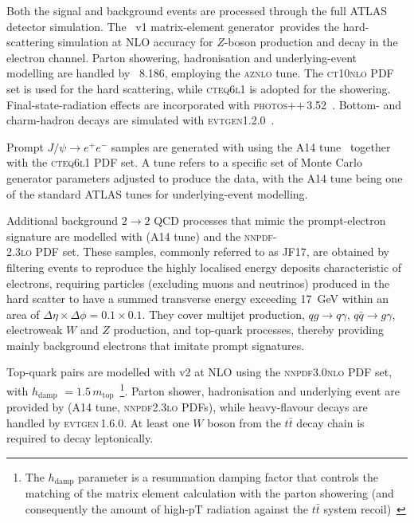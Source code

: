 Both the signal and background events are processed through the full ATLAS detector simulation.
The \powhegbox~v1 matrix-element generator\ provides the hard-scattering simulation at NLO accuracy for $Z$-boson production and decay in the electron channel.  Parton showering, hadronisation and underlying-event modelling are handled by \pythia~8.186, employing the \textsc{aznlo} tune. The \textsc{ct10nlo} PDF set is used for the hard scattering, while \textsc{cteq6l1} is adopted for the showering.
Final-state-radiation effects are incorporated with \textsc{photos++}\,3.52~\cite{davidson2015photosinterfacectechnical,Golonka_2006}.  Bottom- and charm-hadron decays are simulated with \textsc{evtgen}1.2.0~\cite{LANGE2001152}.

Prompt $J/\psi\!\to e^{+}e^{-}$ samples are generated with  using the A14 tune~\cite{A14} together with the \textsc{cteq6l1} PDF set. A tune refers to a specific set of Monte Carlo generator parameters adjusted to produce the data, with the A14 tune being one of the standard ATLAS tunes for underlying-event modelling.

Additional background $2\!\to\!2$ QCD processes that mimic the prompt-electron signature are modelled with  (A14 tune) and the \textsc{nnpdf}-\\{\small2.3}\textsc{lo} PDF set. 
These samples, commonly referred to as JF17, are obtained by filtering events to reproduce the highly localised energy deposits characteristic of electrons, requiring particles (excluding muons and neutrinos) produced in the hard scatter to have a summed transverse energy exceeding 17~GeV within an area of $\Delta\eta \times \Delta\phi = 0.1 \times 0.1$. 
They cover multijet production, $qg\rightarrow q\gamma$, $q\bar{q}\rightarrow g\gamma$, electroweak $W$ and $Z$ production, and top-quark processes, thereby providing mainly background electrons that imitate prompt signatures.

Top-quark pairs are modelled with \powhegbox v2 at NLO using the \textsc{nnpdf3.0nlo} PDF set, with $h_{\text{damp}}$ $=1.5\,m_{\text{top}}$~\footnote{The $h_{\text{damp}}$ parameter is a resummation damping factor that controls the matching of the matrix element calculation with the parton showering (and consequently the amount of high-pT radiation against the $t\bar{t}$ system recoil)~\cite{hdamp}}.
Parton shower, hadronisation and underlying event are provided by  (A14 tune, \textsc{nnpdf2.3lo} PDFs), while heavy-flavour decays are handled by \textsc{evtgen}\,1.6.0.  At least one $W$ boson from the $t\bar t$ decay chain is required to decay leptonically.

